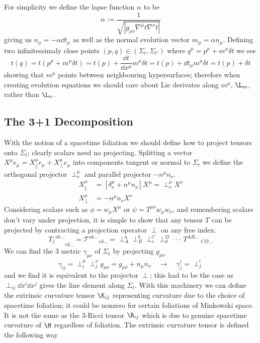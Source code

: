 For simplicity we define the lapse function $\alpha$ to be
\begin{equation}\alpha :=  \frac{1}{\sqrt{|g_{\mu\nu}\nabla^\mu t \nabla^\nu t|}} \end{equation}
giving us $n_\mu = -\alpha \dd t_\mu$ as well as the normal evolution vector $m_\mu = \alpha n_\mu$. Defining two infinitessimaly close points $(p,q)\in(\Sigma_t,\Sigma_{t'})$ where $ q^\mu = p^\mu + m^\mu\delta t$ we see
\[ t(q) = t(p^\mu +  m^\mu\delta t) = t(p) + \frac{\dd t}{\dd x^\mu}m^\mu\delta t = t(p) + \dd t_\mu m^\mu \delta t =  t(p) + \delta t\] 
showing that $m^\mu$ points between neighbouring hypersurfaces; therefore when creating evolution equations we should care about Lie derivates along $m^\mu$, $\L_m$, rather than $\L_n$.



\subsection{The 3+1 Decomposition}
With the notion of a spacetime foliation we should define how to project tensors onto $\Sigma_t$; clearly scalars need no projecting. Splitting a vector $X^\mu e_\mu = X^\mu_\| e_\mu + X^\mu_\perp e_\mu$ into components tangent or normal to $\Sigma_t$ we define the orthogonal projector $\perp^\mu_\nu$ and parallel projector $-n^\mu n_\nu$.
\begin{align}X^\mu_\| &= \left[ \delta^\mu_\nu + n^\mu n_\nu\right] X^\mu  = \perp^\mu_\nu X^\nu\\
X^\mu_\perp &= -n^\mu n_\nu X^\nu \end{align}
Considering scalars such as $\phi = w_\mu X^\mu$ or $\psi = T^{\mu\nu}w_\mu w_\nu$, and remembering scalars don't vary under projection, it is simple to show that any tensor $T$ can be projected by contracting a projection operator $\perp$ on any free index.
\begin{equation} {T_\|}^{ab ...}_{\;\;\;\;\;\;\;cd ...} = {\mathcal{T}}^{ab ...}_{\;\;\;\;\;\;\;cd ...} =\perp^{a}_{A}\perp^{b}_{B}\perp^{C}_{c}\perp^{D}_{d}\cdot\cdot\cdot\, T^{AB ...}_{\;\;\;\;\;\;\;\;\;\;CD ...}\end{equation}
We can find the 3 metric $\gamma_{\mu\nu}$ of $\Sigma_t$ by projecting $g_{\mu\nu}$ 
\begin{equation} \gamma_{ij} = \perp^\mu_i \perp^\nu_j g_{\mu\nu} = g_{\mu\nu} + n_\mu n_\nu\quad \rightarrow \quad \gamma^i_j = \perp^i_j\end{equation}
and we find it is equivalent to the projector $\perp$; this had to be the case as $\perp_{ij}\dd x^i\dd x^j$ gives the line element along $\Sigma_t$. With this machinery we can define the extrinsic curvature tensor $\K_{ij}$ representing curvature due to the choice of spacetime foliation; it could be nonzero for certain foliations of Minkowski space. It is not the same as the 3-Ricci tensor $\R_{ij}$ which is due to genuine spacetime curvature of $\M$ regardless of foliation. The extrinsic curvature tensor is defined the following way

